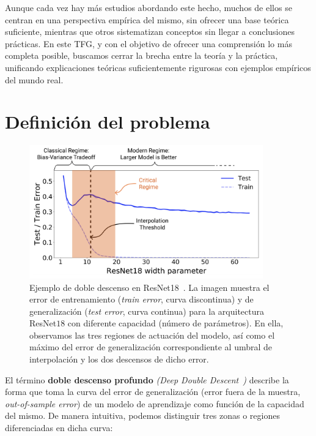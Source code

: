 Aunque cada vez hay más estudios abordando este hecho, muchos de ellos se centran en una perspectiva empírica del mismo, sin ofrecer una base teórica suficiente, mientras que otros sistematizan conceptos sin llegar a conclusiones prácticas. En este TFG, y con el objetivo de ofrecer una comprensión lo más completa posible, buscamos cerrar la brecha entre la teoría y la práctica, unificando explicaciones teóricas suficientemente rigurosas con ejemplos empíricos del mundo real.\newline


\section{Definición del problema}

\begin{figure}[h]
    \centering
    \includegraphics[width=0.9\textwidth]{img/problem-definition.png}
    \caption[Ejemplo de doble descenso profundo en ResNet$18$~\cite{Nakkiran2019}.] {Ejemplo de doble descenso en ResNet18~\cite{Nakkiran2019}. La imagen muestra el error de entrenamiento (\textit{train error}, curva discontinua) y de generalización (\textit{test error}, curva continua) para la arquitectura ResNet$18$ con diferente capacidad (número de parámetros). En ella, observamos las tres regiones de actuación del modelo, así como el máximo del error de generalización correspondiente al umbral de interpolación y los dos descensos de dicho error.}\label{fig:ejemplo-definicion-double-descent}
\end{figure}

El término \textbf{doble descenso profundo} \emph{(Deep Double Descent~\cite{Belkin2019})} describe la forma que toma la curva del error de generalización (error fuera de la muestra, \textit{out-of-sample error}) de un modelo de aprendizaje como función de la capacidad del mismo. De manera intuitiva, podemos distinguir tres zonas o regiones diferenciadas en dicha curva:

